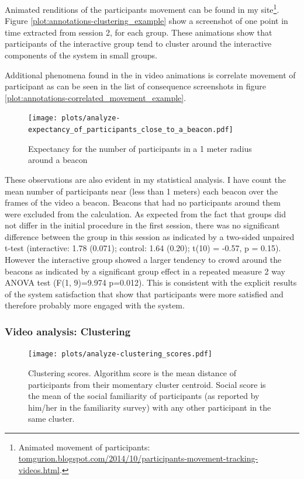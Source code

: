 \documentclass[a4paper,11pt]{article}
\begin{document}
Animated renditions of the participants movement can be found in my site\footnote{Animated movement of participants: \href{http://tomgurion.blogspot.com/2014/10/participants-movement-tracking-videos.html}{tomgurion.blogspot.com/2014/10/participants-movement-tracking-videos.html}.}.
Figure \ref{plot:annotations-clustering_example} show a screenshot of one point in time extracted from session 2, for each group.
These animations show that participants of the interactive group tend to cluster around the interactive components of the system in small groups.

Additional phenomena found in the in video animations is correlate movement of participant as can be seen in the list of consequence screenshots in figure \ref{plot:annotations-correlated_movement_example}.

\begin{figure}[!htb]
    \centering
    \texttt{[image: plots/analyze-expectancy\_of\_participants\_close\_to\_a\_beacon.pdf]}
    \caption{Expectancy for the number of participants in a 1 meter radius around a beacon}\label{plot:analyze-expectancy_of_participants_close_to_a_beacon}
\end{figure}

These observations are also evident in my statistical analysis.
I have count the mean number of participants near (less than 1 meters) each beacon over the frames of the video a beacon.
Beacons that had no participants around them were excluded from the calculation.
As expected from the fact that groups did not differ in the initial procedure in the first session, there was no significant difference between the group in this session as indicated by a two-sided unpaired t-test (interactive: 1.78 (0.071); control: 1.64 (0.20); t(10) = -0.57, p = 0.15).
However the interactive group showed a larger tendency to crowd around the beacons as indicated by a significant group effect in a repeated measure 2 way ANOVA test (F(1, 9)=9.974 p=0.012).
This is consistent with the explicit results of the system satisfaction that show that participants were more satisfied and therefore probably more engaged with the system.

\subsubsection{Video analysis: Clustering}\label{results:clustering}

\begin{figure}[!htb]
    \centering
    \texttt{[image: plots/analyze-clustering\_scores.pdf]}
    \caption{Clustering scores. Algorithm score is the mean distance of participants from their momentary cluster centroid. Social score is the mean of the social familiarity of participants (as reported by him/her in the familiarity survey) with any other participant in the same cluster.}\label{plot:analyze-clustering_scores}
\end{figure}
\end{document}
